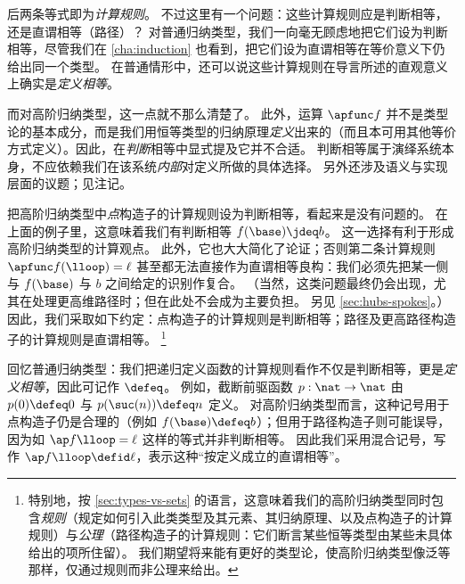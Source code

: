 %
%
后两条等式即为\emph{计算规则}。
%
%
不过这里有一个问题：这些计算规则应是判断相等，还是直谓相等（路径）？
对普通归纳类型，我们一向毫无顾虑地把它们设为判断相等，尽管我们在 \cref{cha:induction} 也看到，把它们设为直谓相等在等价意义下仍给出同一个类型。
在普通情形中，还可以说这些计算规则在导言所述的直观意义上确实是\emph{定义相等}。

%
而对高阶归纳类型，这一点就不那么清楚了。 %
此外，运算 $\apfunc f$ 并不是类型论的基本成分，而是我们用恒等类型的归纳原理\emph{定义}出来的（而且本可用其他等价方式定义）。因此，在\emph{判断}相等中显式提及它并不合适。
判断相等属于演绎系统本身，不应依赖我们在该系统\emph{内部}对定义所做的具体选择。
另外还涉及语义与实现层面的议题；见注记。

把高阶归纳类型中\emph{点}构造子的计算规则设为判断相等，看起来是没有问题的。
在上面的例子里，这意味着我们有判断相等 $f(\base)\jdeq b$。
这一选择有利于形成高阶归纳类型的计算观点。
此外，它也大大简化了论证；否则第二条计算规则 $\apfunc f (\lloop) = \ell$ 甚至都无法直接作为直谓相等良构：我们必须先把某一侧与 $f(\base)$ 与 $b$ 之间给定的识别作复合。
（当然，这类问题最终仍会出现，尤其在处理更高维路径时；但在此处不会成为主要负担。
另见 \cref{sec:hubs-spokes}。）
因此，我们采取如下约定：点构造子的计算规则是判断相等；路径及更高路径构造子的计算规则是直谓相等。%
\footnote{特别地，按 \cref{sec:types-vs-sets} 的语言，这意味着我们的高阶归纳类型同时包含\emph{规则}（规定如何引入此类类型及其元素、其归纳原理、以及点构造子的计算规则）与\emph{公理}（路径构造子的计算规则：它们断言某些恒等类型由某些未具体给出的项所住留）。
我们期望将来能有更好的类型论，使高阶归纳类型像泛等那样，仅通过规则而非公理来给出。%
%
%
}

\begin{rmk}\label{rmk:defid}
回忆普通归纳类型：我们把递归定义函数的计算规则看作不仅是判断相等，更是\emph{定义相等}，因此可记作 $\defeq$。
例如，截断前驱函数 $p:\nat\to\nat$ 由 $p(0)\defeq 0$ 与 $p(\suc(n))\defeq n$ 定义。
对高阶归纳类型而言，这种记号用于点构造子仍是合理的（例如 $f(\base)\defeq b$）；但用于路径构造子则可能误导，因为如 $\ap f \lloop = \ell$ 这样的等式并非判断相等。
因此我们采用混合记号，写作 $\ap f \lloop \defid \ell$，表示这种“按定义成立的直谓相等”。
\end{rmk}
%
%

